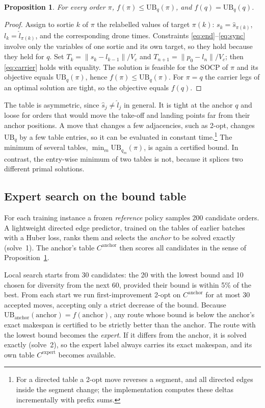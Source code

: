 \documentclass[preprint,review,12pt,authoryear]{elsarticle}
\newtheorem{proposition}{Proposition}
\newcommand{\UB}{\mathrm{UB}}
\begin{document}
\begin{proposition}\label{prop:ub}
For every order $\pi$, $f(\pi)\le \UB_q(\pi)$, and $f(q)=\UB_q(q)$.
\end{proposition}
\begin{proof}
Assign to sortie $k$ of $\pi$ the relabelled values of target $\pi(k)$: $s_k=\hat s_{\pi(k)}$,
$l_k=\hat l_{\pi(k)}$, and the corresponding drone times. Constraints \eqref{eq:end}--\eqref{eq:sync} involve
only the variables of one sortie and its own target, so they hold because they held for $q$. Set
$T_k=\|s_k-l_{k-1}\|/V_c$ and $T_{n+1}=\|p_0-l_n\|/V_c$; then \eqref{eq:carrier} holds with equality. The
solution is feasible for the SOCP of $\pi$ and its objective equals $\UB_q(\pi)$, hence $f(\pi)\le\UB_q(\pi)$.
For $\pi=q$ the carrier legs of an optimal solution are tight, so the objective equals $f(q)$.
\end{proof}

The table is asymmetric, since $\hat s_j\neq\hat l_j$ in general. It is tight at the anchor $q$ and loose for
orders that would move the take-off and landing points far from their anchor positions. A move that changes a
few adjacencies, such as 2-opt, changes $\UB_q$ by a few table entries, so it can be evaluated in constant
time.\footnote{For a directed table a 2-opt move reverses a segment, and all directed edges inside the segment
change; the implementation computes these deltas incrementally with prefix sums.} The minimum of several tables,
$\min_m \UB_{q_m}(\pi)$, is again a certified bound. In contrast, the entry-wise minimum of two tables is not,
because it splices two different primal solutions.

\subsection{Expert search on the bound table}\label{sec:expert}
For each training instance a frozen \emph{reference} policy samples 200 candidate orders. A lightweight directed
edge predictor, trained on the tables of earlier batches with a Huber loss, ranks them and selects the
\emph{anchor} to be solved exactly (solve~1). The anchor's table $C^{\text{anchor}}$ then scores all candidates
in the sense of Proposition~\ref{prop:ub}.

Local search starts from 30 candidates: the 20 with the lowest bound and 10 chosen for diversity from the next 60,
provided their bound is within 5\% of the best. From each start we run first-improvement 2-opt on
$C^{\text{anchor}}$ for at most 30 accepted moves, accepting only a strict decrease of the bound. Because
$\UB_{\text{anchor}}(\text{anchor})=f(\text{anchor})$, any route whose bound is below the anchor's exact makespan
is certified to be strictly better than the anchor. The route with the lowest bound becomes the \emph{expert}. If
it differs from the anchor, it is solved exactly (solve~2), so the expert label always carries its exact makespan,
and its own table $C^{\text{expert}}$ becomes available.
\end{document}
